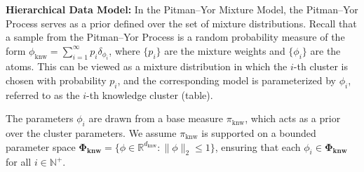 \documentclass[11pt]{article}
\theoremstyle{plain}
\theoremstyle{definition}
\newcommand{\knwModel}{\phi_{\text{knw}}}
\newcommand{\knwfamily}{\mathbf{\Phi_{\text{knw}}}}
\newcommand{\knwdimension}{d_{\text{knw}}}
\newcommand{\basemeasure}{\pi_{\text{knw}}}
\newcommand{\jian}[1]{{\it \color{red}{Jian: #1}}}
\begin{document}
\noindent
{\bf Hierarchical Data Model:}
In the Pitman–Yor Mixture Model, the Pitman–Yor Process serves as a prior defined over the set of mixture distributions. 
Recall that a sample from the Pitman–Yor Process is a random probability measure of the form \( \knwModel = \sum_{i=1}^{\infty} p_i \delta_{\phi_i} \), 
where \( \{p_i\} \) are the mixture weights and \( \{\phi_i\} \) are the atoms. This can be viewed as a mixture distribution in which the \( i \)-th cluster is chosen with probability \( p_i \), 
and the corresponding model is parameterized by \( \phi_i \), referred to as the \( i \)-th knowledge cluster (table).

The parameters \( \phi_i \) are drawn from a base measure \( \basemeasure\), which acts as a prior over the cluster parameters. 
We assume \( \basemeasure \) is supported on a bounded parameter space \( \knwfamily = \{ \phi \in \mathbb{R}^{\knwdimension} : \|\phi\|_2 \le 1 \} \), 
ensuring that each \( \phi_i \in \knwfamily \) for all \( i \in \mathbb{N}^+ \).

\end{document}
